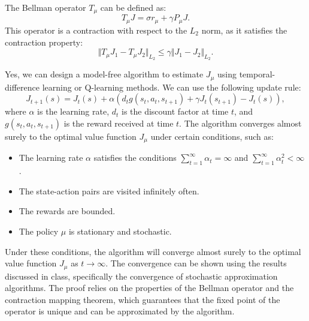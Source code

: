 The Bellman operator \( T_{\mu} \) can be defined as:
\[
    T_{\mu} J=\sigma r_{\mu}+\gamma P_{\mu} J.
\]
This operator is a contraction with respect to the \( L_{2} \) norm, as it satisfies the contraction property:
\[
    \Vert T_{\mu} J_{1}-T_{\mu} J_{2} \Vert_{L_{2}} \leq \gamma \Vert J_{1}-J_{2} \Vert_{L_{2}}.
\]

Yes, we can design a model-free algorithm to estimate \( J_{\mu} \) using temporal-difference learning or Q-learning methods.
We can use the following update rule:
\[
    J_{t+1}(s) = J_{t}(s) + \alpha \left( d_{t} g\left(s_{t}, a_{t}, s_{t+1}\right) + \gamma J_{t}(s_{t+1}) - J_{t}(s) \right),
\]
where \( \alpha \) is the learning rate, \( d_{t} \) is the discount factor at time \( t \), and \( g\left(s_{t}, a_{t}, s_{t+1}\right) \) is the reward received at time \( t \).
The algorithm converges almost surely to the optimal value function \( J_{\mu} \) under certain conditions, such as:
\begin{itemize}[noitemsep]
    \item The learning rate \( \alpha \) satisfies the conditions \( \sum_{t=1}^{\infty} \alpha_{t} = \infty \) and \( \sum_{t=1}^{\infty} \alpha_{t}^{2} < \infty \).
    \item The state-action pairs are visited infinitely often.
    \item The rewards are bounded.
    \item The policy \( \mu \) is stationary and stochastic.
\end{itemize}
Under these conditions, the algorithm will converge almost surely to the optimal value function \( J_{\mu} \) as \( t \to \infty \).
The convergence can be shown using the results discussed in class, specifically the convergence of stochastic approximation algorithms.
The proof relies on the properties of the Bellman operator and the contraction mapping theorem, which guarantees that the fixed point of the operator is unique and can be approximated by the algorithm.
